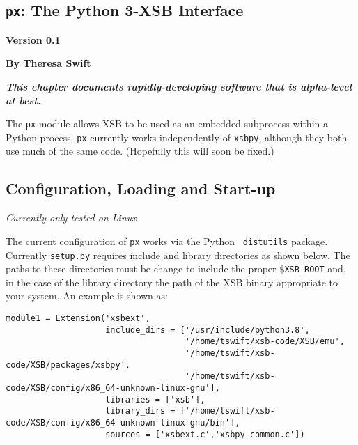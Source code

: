 
\newcommand{\pxversion}{Version 0.1}

\begin{center}
\chapter[Python and XSB]{{\tt px}: The Python 3-XSB Interface} \label{chap:px}
\end{center}

\vspace*{-.30in} 
\begin{center}
{\Large {\bf  \pxversion}}
\end{center}

\begin{center}
  {\Large {\bf By Theresa Swift}}
\end{center}

\noindent
{\large {\bf {\em This chapter documents rapidly-developing software that is alpha-level at best.}}}

The {\tt px} module allows XSB to be used as an embedded subprocess
within a Python process.  {\tt px} currently works independently of
{\tt xsbpy}, although they both use much of the same code.  (Hopefully
this will soon be fixed.)

\section{Configuration, Loading and Start-up}

{\em Currently only tested on Linux}

The current configuration of {\tt px} works via the Python {\tt
  distutils} package.  Currently {\tt setup.py} requires include and
library directories as shown below.  The paths to these directories
must be change to include the proper {\tt \$XSB\_ROOT} and, in the
case of the library directory the path of the XSB binary appropriate
to your system.  An example is shown as:

\begin{footnotesize}
  \begin{verbatim}
module1 = Extension('xsbext',
                    include_dirs = ['/usr/include/python3.8',
                                    '/home/tswift/xsb-code/XSB/emu',
                                    '/home/tswift/xsb-code/XSB/packages/xsbpy',
                                    '/home/tswift/xsb-code/XSB/config/x86_64-unknown-linux-gnu'],
                    libraries = ['xsb'],
                    library_dirs = ['/home/tswift/xsb-code/XSB/config/x86_64-unknown-linux-gnu/bin'],
                    sources = ['xsbext.c','xsbpy_common.c'])
  \end{verbatim}
\end{footnotesize}

